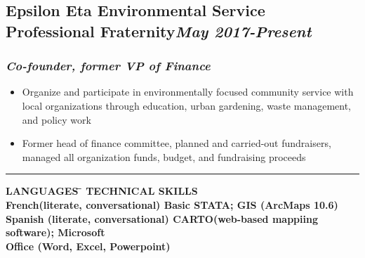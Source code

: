 \documentclass{article}
\begin{document}
\subsection*{\bf{Epsilon Eta Environmental Service Professional Fraternity}\hfill \textit{\small May 2017-Present}}
\subsubsection*{\textit{Co-founder, former VP of Finance}}
\begin{itemize}
    \item {Organize and participate in environmentally focused  community service with local organizations through education, urban gardening, waste management, and policy work}
    \item{Former head of finance committee, planned and carried-out fundraisers, managed all organization funds, budget, and fundraising proceeds}
\end{itemize}


\noindent\rule{19cm}{0.4pt}
\begin{tabbing}
\hspace{0.5in}\bf{LANGUAGES} \= \hspace{2.5in}
\bf{TECHNICAL SKILLS} \\
\hspace{0.5in}French(literate, conversational) \> \hspace{2.5in}Basic STATA; GIS (ArcMaps 10.6) \\ 
\hspace{0.5in}Spanish (literate, conversational) \> \hspace{2.5in}CARTO(web-based mappiing software); Microsoft\\ \> \hspace{2.5in}Office (Word, Excel, Powerpoint)
\end{tabbing}
\end{document}
